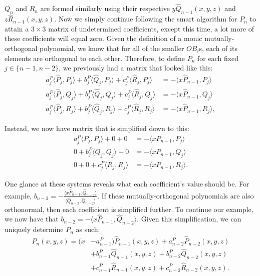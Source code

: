 \documentclass[letterpaper, 12pt]{article}
\begin{document}
\noindent $Q_n$ and $R_n$ are formed similarly using their respective $y\hat{Q}_{n-1}(x, y, z)$ and $z\hat{R}_{n-1}(x, y, z)$. Now we simply continue following the smart algorithm for $P_n$ to attain a $3\times 3$ matrix of undetermined coefficients, except this time, a lot more of these coefficients will equal zero. Given the definition of a monic mutually-orthogonal polynomial, we know that for all of the smaller $OB_i$s, each of its elements are orthogonal to each other. Therefore, to define $P_n$ for each fixed $j \in \{n-1, n-2\}$, we previously had a matrix that looked like this:
\begin{align*}
	a_j^P\langle \hat{P}_j, P_j \rangle + b_j^P\langle \hat{Q}_j, P_j \rangle + c_j^P\langle \hat{R}_j, P_j \rangle &= - \langle x\hat{P}_{n-1}, P_j\rangle \\
	a_j^P\langle \hat{P}_j, Q_j \rangle + b_j^P\langle \hat{Q}_j, Q_j \rangle + c_j^P\langle \hat{R}_j, Q_j \rangle &= - \langle x\hat{P}_{n-1}, Q_j\rangle \\
	a_j^P\langle \hat{P}_j, R_j \rangle + b_j^P\langle \hat{Q}_j, R_j \rangle + c_j^P\langle \hat{R}_j, R_j \rangle&= - \langle x\hat{P}_{n-1}, R_j\rangle,
\end{align*}

\noindent Instead, we now have matrix that is simplified down to this:
\begin{align*}
	a_j^P\langle P_j, P_j \rangle +0 +0&= - \langle xP_{n-1}, P_j\rangle \\
	0+ b_j^P\langle Q_j, Q_j\rangle +0&= - \langle xP_{n-1}, Q_j\rangle \\
	0+ 0+ c_j^P\langle R_j, R_j \rangle&= - \langle xP_{n-1}, R_j\rangle.
\end{align*}

\noindent One glance at these systems reveals what each coefficient's value should be. For example, $b_{n-2} = -\frac{\langle x\hat{P}_{n-1}, \hat{Q}_{n-2}\rangle}{\langle \hat{Q}_{n-2}, \hat{Q}_{n-2}\rangle}$. If these mutually-orthogonal polynomials are also orthonormal, then each coefficient is simplified further. To continue our example, we now have that $b_{n-2} = -\langle x\hat{P}_{n-1}, \hat{Q}_{n-2}\rangle$. Given this simplification, we can uniquely determine $P_n$ as such:
\begin{align*}
	P_n(x,y,z) = (x&-a_{n-1}^P)\hat{P}_{n-1}(x,y,z) + a_{n-2}^P\hat{P}_{n-2}(x,y,z) \\
				&+ b_{n-1}^P\hat{Q}_{n-1}(x,y,z) + b_{n-2}^P\hat{Q}_{n-2}(x,y,z) \\
				&+ c_{n-1}^P\hat{R}_{n-1}(x,y,z) + c_{n-2}^P\hat{R}_{n-2}(x,y,z).
\end{align*}
\end{document}
